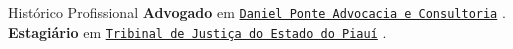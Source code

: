 \begin{rubric}{Histórico Profissional}
%
	\textbf{Advogado} em {\href{http://danielponte.com.br/}{\texttt{Daniel Ponte Advocacia e Consultoria}}} .
%
%
\entry*[2020 -- 2021]%
	\textbf{Estagiário} em {\href{https://www.tjpi.jus.br/portaltjpi/}{\texttt{Tribinal de Justiça do Estado do Piauí}}} .
%
\end{rubric}
